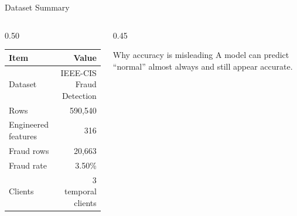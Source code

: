 \documentclass[aspectratio=169,10pt]{beamer}
\begin{document}
\begin{frame}{Dataset Summary}
  \begin{columns}[T]
    \begin{column}{0.50\textwidth}
      \begin{table}
        \centering
        \begin{tabular}{lr}
          \toprule
          Item & Value \\
          \midrule
          Dataset & IEEE-CIS Fraud Detection \\
          Rows & 590,540 \\
          Engineered features & 316 \\
          Fraud rows & 20,663 \\
          Fraud rate & 3.50\% \\
          Clients & 3 temporal clients \\
          \bottomrule
        \end{tabular}
      \end{table}
    \end{column}
    \begin{column}{0.45\textwidth}
      \vspace{-0.2cm}
      \begin{block}{Why accuracy is misleading}
        A model can predict ``normal'' almost always and still appear accurate.
      \end{block}
    \end{column}
  \end{columns}
\end{frame}
\end{document}
